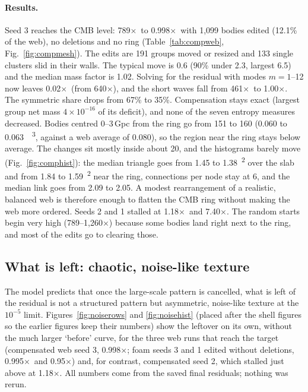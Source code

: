 \documentclass[aps,prd,twocolumn,nofootinbib,superscriptaddress,floatfix]{revtex4-2}
\newcommand{\fl}{\ensuremath{\times}}
\begin{document}
\paragraph*{Results.} Seed 3 reaches the CMB level: 789\fl\ to 0.998\fl\ with 1,099 bodies edited (12.1\% of the web), no deletions and no ring (Table~\ref{tab:compweb}, Fig.~\ref{fig:compmesh}). The edits are 191 groups moved or resized and 133 single clusters slid in their walls. The typical move is \SI{0.6}{\Gpc} (90\% under \SI{2.3}{\Gpc}, largest \SI{6.5}{\Gpc}) and the median mass factor is 1.02. Solving for the residual with modes $m=1$--12 now leaves 0.02\fl\ (from 640\fl), and the short waves fall from 461\fl\ to 1.00\fl. The symmetric share drops from 67\% to 35\%. Compensation stays exact (largest group net mass $4\times10^{-16}$ of its deficit), and none of the seven entropy measures decreased. Bodies centred 0--3\,Gpc from the ring go from 151 to 160 (0.060 to \SI{0.063}{\per\Gpc\cubed}, against a web average of 0.080), so the region near the ring stays below average. The changes sit mostly inside about \SI{20}{\Gpc}, and the histograms barely move (Fig.~\ref{fig:comphist}): the median triangle goes from 1.45 to \SI{1.38}{\Gpc\squared} over the slab and from 1.84 to \SI{1.59}{\Gpc\squared} near the ring, connections per node stay at 6, and the median link goes from 2.09 to \SI{2.05}{\Gpc}. A modest rearrangement of a realistic, balanced web is therefore enough to flatten the CMB ring without making the web more ordered. Seeds 2 and 1 stalled at 1.18\fl\ and 7.40\fl. The random starts begin very high (789--1,260\fl) because some bodies land right next to the ring, and most of the edits go to clearing those.

\subsection{What is left: chaotic, noise-like texture}\label{sec:noise}
The model predicts that once the large-scale pattern is cancelled, what is left of the residual is not a structured pattern but asymmetric, noise-like texture at the $10^{-5}$ limit. Figures~\ref{fig:noiserows} and \ref{fig:noisehist} (placed after the shell figures so the earlier figures keep their numbers) show the leftover on its own, without the much larger `before' curve, for the three web runs that reach the target (compensated web seed 3, 0.998\fl; foam seeds 3 and 1 edited without deletions, 0.995\fl\ and 0.95\fl) and, for contrast, compensated seed 2, which stalled just above at 1.18\fl. All numbers come from the saved final residuals; nothing was rerun.
\end{document}
